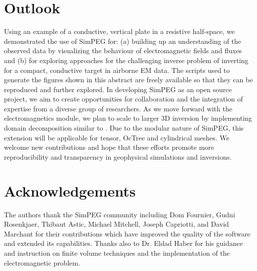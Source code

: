 \documentclass[paper]{geophysics}
\begin{document}
\section{Outlook}
Using an example of a conductive, vertical plate in a resistive half-space, we demonstrated the use of SimPEG for: (a) building up an understanding of the observed data by visualizing the behaviour of electromagnetic fields and fluxes and (b) for exploring approaches for the challenging inverse problem of inverting for a compact, conductive target in airborne EM data. The scripts used to generate the figures shown in this abstract are freely available so that they can be reproduced and further explored. In developing SimPEG as an open source project, we aim to create opportunities for collaboration and the integration of expertise from a diverse group of researchers. As we move forward with the electromagnetics module, we plan to scale to larger 3D inversion by implementing domain decomposition similar to \cite{yang2014}. Due to the modular nature of SimPEG, this extension will be applicable for tensor, OcTree and cylindrical meshes. We welcome new contributions and hope that these efforts promote more reproducibility and transparency in geophysical simulations and inversions.

\section{Acknowledgements}
The authors thank the SimPEG community including Dom Fournier, Gudni Rosenkjaer, Thibaut Astic, Michael Mitchell, Joseph Capriotti, and David Marchant for their contributions which have improved the quality of the software and extended its capabilities. Thanks also to Dr. Eldad Haber for his guidance and instruction on finite volume techniques and the implementation of the electromagnetic problem.
\clearpage

\end{document}

